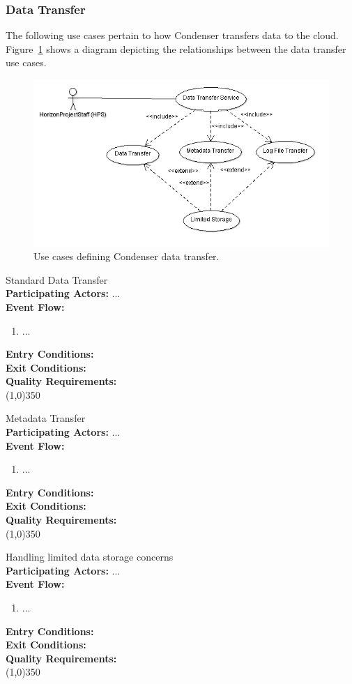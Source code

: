 \subsubsection{Data Transfer}		
The following use cases pertain to how Condenser transfers data to the cloud. Figure~\ref{DataTransferUse} shows a diagram depicting the relationships between the data transfer use cases.
\begin{center}
	\begin{figure}[htbp]
		\includegraphics[scale=.5]{images/DataTransferUse.png}
		\caption{Use cases defining Condenser data transfer.\label{DataTransferUse}}
	\end{figure}
\end{center}	
 
		Standard Data Transfer\\	 
		\textbf{Participating Actors:}  ... \\
		\textbf{Event Flow:}
		\begin{enumerate}
\item  ...
	    \end{enumerate}
		\textbf{Entry Conditions:}\\
		\textbf{Exit Conditions:}\\
		\textbf{Quality Requirements:}\\
		\line(1,0){350}			
			 
		Metadata Transfer\\	 
		\textbf{Participating Actors:}  ... \\
		\textbf{Event Flow:}
		\begin{enumerate}
\item  ...
	    \end{enumerate}
		\textbf{Entry Conditions:}\\
		\textbf{Exit Conditions:}\\
		\textbf{Quality Requirements:}\\
		\line(1,0){350}		
			 
		Handling limited data storage concerns \\	 
		\textbf{Participating Actors:}  ... \\
		\textbf{Event Flow:}
		\begin{enumerate}
\item  ...
	    \end{enumerate}
		\textbf{Entry Conditions:}\\
		\textbf{Exit Conditions:}\\
		\textbf{Quality Requirements:}\\
		\line(1,0){350}	